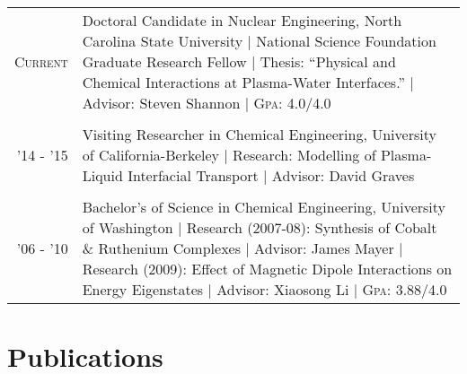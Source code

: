 \documentclass[a4paper,10pt]{article} %
\begin{document}
\begin{table}[h]
\begin{tabularx}{\textwidth}{rX}	

\textsc{Current} & Doctoral Candidate in Nuclear Engineering, North Carolina State University | National Science Foundation Graduate Research Fellow | Thesis: ``Physical and Chemical Interactions at Plasma-Water Interfaces.'' | Advisor: Steven Shannon | \textsc{Gpa}: 4.0/4.0\\
&\\


\textsc{'14 - '15} & Visiting Researcher in Chemical Engineering, University of California-Berkeley | Research: Modelling of Plasma-Liquid Interfacial Transport | Advisor: David Graves\\
&\\


\textsc{'06 - '10} & Bachelor's of Science in Chemical Engineering, University of Washington | Research (2007-08): Synthesis of Cobalt \& Ruthenium Complexes | Advisor: James Mayer | Research (2009): Effect of Magnetic Dipole Interactions on Energy Eigenstates | Advisor: Xiaosong Li | \textsc{Gpa}: 3.88/4.0\\ 

\end{tabularx}
\end{table}


\section{Publications}
\end{document}
